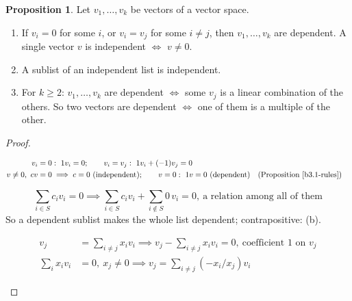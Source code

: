 \documentclass[12pt]{article}
\theoremstyle{definition}
\newtheorem{proposition}[theorem]{Proposition}
\newcommand{\boardtop}{\vspace*{-\abovedisplayskip}}
\begin{document}
\begin{proposition}\label{b3.13}
Let \(v_1,\dots,v_k\) be vectors of a vector space.
\begin{enumerate}
\item If \(v_i=0\) for some \(i\), or \(v_i=v_j\) for some \(i\ne j\), then \(v_1,\dots,v_k\) are dependent. A single
vector \(v\) is independent \(\iff\) \(v\ne0\).
\item A sublist of an independent list is independent.
\item For \(k\geqslant2\): \(v_1,\dots,v_k\) are dependent \(\iff\) some \(v_j\) is a linear combination of the others.
So two vectors are dependent \(\iff\) one of them is a multiple of the other.
\end{enumerate}
\end{proposition}
\begin{proof}
\begin{board}
\boardtop
\begin{align*}
v_i=0&:\ 1v_i=0;\qquad v_i=v_j:\ 1v_i+(-1)v_j=0\\
v\ne0,\ cv=0&\implies c=0\ (\text{independent});\qquad v=0:\ 1v=0\ (\text{dependent})&&\text{(Proposition~\ref{b3.1-rules})}
\end{align*}
\end{board}
\begin{board}[(b) \(S\subseteq\{1,\dots,k\}\) the indices of a sublist; a relation among the \(v_i\), \(i\in S\) (not all
\(c_i=0\)):]
\[
\textstyle\sum_{i\in S}c_iv_i=0\implies\sum_{i\in S}c_iv_i+\sum_{i\notin S}0\,v_i=0,\ \text{a relation among all of them}
\]
So a dependent sublist makes the whole list dependent; contrapositive: (b).
\end{board}
\begin{board}
\boardtop
\begin{align*}
v_j&=\textstyle\sum_{i\ne j}x_iv_i\implies v_j-\sum_{i\ne j}x_iv_i=0,\ \text{coefficient }1\text{ on }v_j\\
\textstyle\sum_ix_iv_i&=0,\ x_j\ne0\implies v_j=\textstyle\sum_{i\ne j}(-x_i/x_j)v_i
\end{align*}
\end{board}
\nopagebreak
\end{proof}
\end{document}
